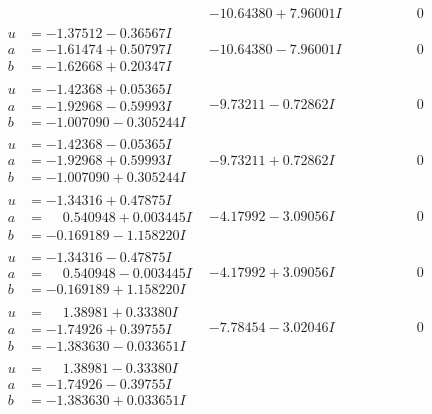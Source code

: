 \documentclass[1p]{elsarticle_modified}
\theoremstyle{definition}
\begin{document}
$$\begin{array}{c|c|c}
 & -10.64380 + 7.96001 I & \phantom{-0.000000 } 0 \\ \hline\begin{aligned}
u &= -1.37512 - 0.36567 I \\
a &= -1.61474 + 0.50797 I \\
b &= -1.62668 + 0.20347 I\end{aligned}
 & -10.64380 - 7.96001 I & \phantom{-0.000000 } 0 \\ \hline\begin{aligned}
u &= -1.42368 + 0.05365 I \\
a &= -1.92968 - 0.59993 I \\
b &= -1.007090 - 0.305244 I\end{aligned}
 & -9.73211 - 0.72862 I & \phantom{-0.000000 } 0 \\ \hline\begin{aligned}
u &= -1.42368 - 0.05365 I \\
a &= -1.92968 + 0.59993 I \\
b &= -1.007090 + 0.305244 I\end{aligned}
 & -9.73211 + 0.72862 I & \phantom{-0.000000 } 0 \\ \hline\begin{aligned}
u &= -1.34316 + 0.47875 I \\
a &= \phantom{-}0.540948 + 0.003445 I \\
b &= -0.169189 - 1.158220 I\end{aligned}
 & -4.17992 - 3.09056 I & \phantom{-0.000000 } 0 \\ \hline\begin{aligned}
u &= -1.34316 - 0.47875 I \\
a &= \phantom{-}0.540948 - 0.003445 I \\
b &= -0.169189 + 1.158220 I\end{aligned}
 & -4.17992 + 3.09056 I & \phantom{-0.000000 } 0 \\ \hline\begin{aligned}
u &= \phantom{-}1.38981 + 0.33380 I \\
a &= -1.74926 + 0.39755 I \\
b &= -1.383630 - 0.033651 I\end{aligned}
 & -7.78454 - 3.02046 I & \phantom{-0.000000 } 0 \\ \hline\begin{aligned}
u &= \phantom{-}1.38981 - 0.33380 I \\
a &= -1.74926 - 0.39755 I \\
b &= -1.383630 + 0.033651 I\end{aligned}

\end{array}$$
\end{document}
